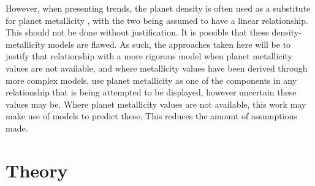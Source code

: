 \documentclass[a4paper,twocolumn,12pt]{article}
\begin{document}


However, when presenting trends, the planet density is often used as a substitute for planet metallicity \cite{Wilson}, with the two being assumed to have a linear relationship. This should not be done without justification. It is possible that these density-metallicity models are flawed. As such, the approaches taken here will be to justify that relationship with a more rigorous model when planet metallicity values are not available, and where metallicity values have been derived through more complex models, use planet metallicity as one of the components in any relationship that is being attempted to be displayed, however uncertain these values may be. Where planet metallicity values are not available, this work may make use of models to predict these. This reduces the amount of assumptions made.





\section{Theory}
\label{section: Theory}
\end{document}
